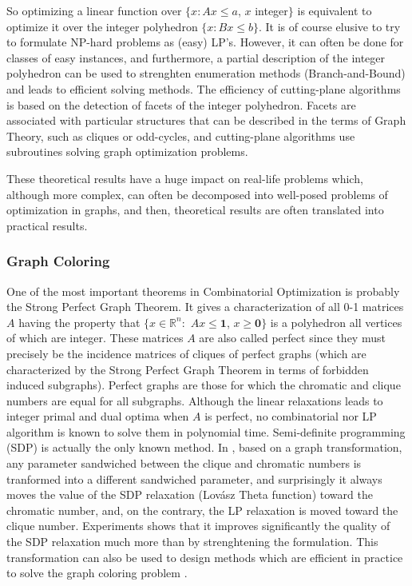 So optimizing a linear function over $\{x:Ax\le a$, 
$x$
 integer$\}$
 is equivalent to optimize it over the integer polyhedron
 $\{x:Bx\le b\}$.
 It is of course elusive to try to formulate NP-hard problems as (easy) LP's.
 However, it can often be done for classes of easy instances, and furthermore, a partial description of the integer polyhedron can be used to strenghten enumeration methods (Branch-and-Bound) and leads to efficient solving methods.
 The efficiency of cutting-plane algorithms is based on the detection of facets of the integer polyhedron.
 Facets are associated with particular structures that can be described in the terms of Graph Theory, such as cliques or odd-cycles, and cutting-plane algorithms use subroutines solving graph optimization problems. 

These theoretical results have a huge impact on real-life problems which, although more complex, can often be decomposed into 
well-posed problems of optimization in graphs, and then, theoretical results are often translated into practical results.
 

\subsubsection{Graph Coloring}

One of the most important theorems in Combinatorial Optimization is probably the Strong Perfect Graph Theorem.
It gives a characterization of all 0-1 matrices $A$ having the property that
$\{x\in \mathbb{R}^n:$ $Ax\le \mathbf{1}$, $x\ge \mathbf{0}\}$ is a polyhedron all vertices of which are integer.
These matrices $A$ are also called perfect since they must precisely be the incidence matrices of cliques of perfect graphs (which are characterized by the Strong Perfect Graph Theorem in terms of forbidden induced subgraphs).
Perfect graphs are those for which the chromatic and clique numbers are equal for all subgraphs.  
Although the linear relaxations leads to integer primal and dual optima when $A$ is perfect, no combinatorial nor LP algorithm is known to solve them in polynomial time. Semi-definite programming (SDP) is actually the only known method.
In \cite{Cornaz2014Chromatic-623556}, based on a graph transformation, any parameter sandwiched between the clique and chromatic numbers is tranformed into a different sandwiched parameter, and surprisingly it always moves the value of the SDP relaxation (Lov\'asz Theta function) toward the chromatic number, and, on the contrary, the LP relaxation is moved toward the clique number. Experiments shows that it improves significantly the quality of the SDP relaxation much more than by strenghtening the formulation.
This transformation can also be used to design methods which are efficient in practice to solve the graph coloring problem \cite{DBLP:journals/networks/FuriniGT17,Cornaz2017151}.

